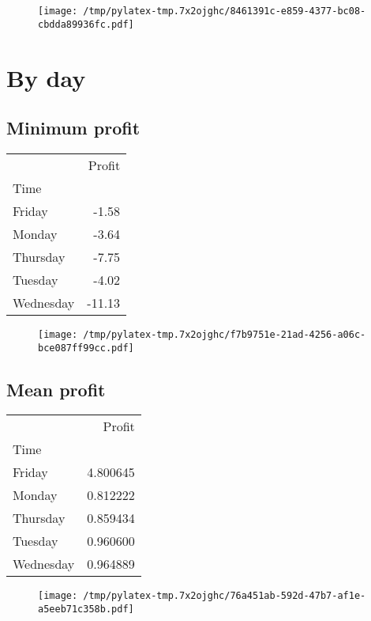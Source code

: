 \documentclass{article}%
\begin{document}
\begin{figure}[htbp]%
\centering%
\texttt{[image: /tmp/pylatex-tmp.7x2ojghc/8461391c-e859-4377-bc08-cbdda89936fc.pdf]}%
\end{figure}

%
\newpage %
\section{By day}%
\label{sec:Byday}%
\subsection{Minimum profit }%
\label{subsec:Minimumprofit}%
\begin{tabular}{lr}
\toprule
{} &  Profit \\
Time      &         \\
\midrule
Friday    &   -1.58 \\
Monday    &   -3.64 \\
Thursday  &   -7.75 \\
Tuesday   &   -4.02 \\
Wednesday &  -11.13 \\
\bottomrule
\end{tabular}
%


\begin{figure}[htbp]%
\centering%
\texttt{[image: /tmp/pylatex-tmp.7x2ojghc/f7b9751e-21ad-4256-a06c-bce087ff99cc.pdf]}%
\end{figure}

%
\newpage %
\subsection{Mean profit }%
\label{subsec:Meanprofit}%
\begin{tabular}{lr}
\toprule
{} &    Profit \\
Time      &           \\
\midrule
Friday    &  4.800645 \\
Monday    &  0.812222 \\
Thursday  &  0.859434 \\
Tuesday   &  0.960600 \\
Wednesday &  0.964889 \\
\bottomrule
\end{tabular}
%


\begin{figure}[htbp]%
\centering%
\texttt{[image: /tmp/pylatex-tmp.7x2ojghc/76a451ab-592d-47b7-af1e-a5eeb71c358b.pdf]}%
\end{figure}
\end{document}
